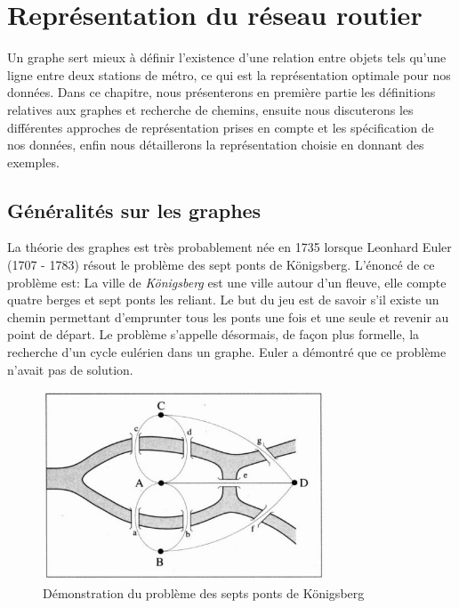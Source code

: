 \chapter{Représentation du réseau routier}
Un graphe sert mieux à définir l'existence d'une relation entre objets tels qu'une ligne entre deux stations de métro, ce qui est la représentation optimale pour nos données. Dans ce chapitre, nous présenterons en première partie les définitions relatives aux graphes et recherche de chemins, ensuite nous discuterons les différentes approches de représentation prises en compte et les spécification de nos données, enfin nous détaillerons la représentation choisie en donnant des exemples.

\section{Généralités sur les graphes}
La théorie des graphes est très probablement née en 1735 lorsque Leonhard Euler (1707 - 1783) résout le problème des sept ponts de Königsberg. 
L'énoncé de ce problème est: La ville de \emph{Königsberg} est une ville autour d'un fleuve, elle compte quatre berges et sept ponts les reliant. Le but du jeu est de savoir s'il existe un chemin permettant d'emprunter tous les ponts une fois et une seule et revenir au point de départ. Le problème s'appelle désormais, de façon plus formelle, la recherche d'un cycle eulérien dans un graphe. Euler a démontré que ce problème n'avait pas de solution.

\begin{figure}[h!]
\center
\includegraphics[width=0.75\textwidth]{img/Bridges.jpg}
\caption{Démonstration du problème des septs ponts de Königsberg}
\end{figure}

